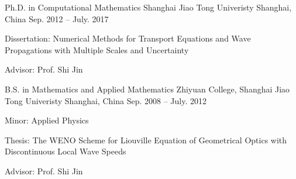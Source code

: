

\begin{cventries}

  \cventry
    {Ph.D. in Computational Mathematics} %
    {Shanghai Jiao Tong Univeristy} %
    {Shanghai, China} %
    {Sep. 2012 -- July. 2017} %
    {
      \begin{cvitems} %
        \item {Dissertation: Numerical Methods for Transport Equations
          and Wave Propagations with Multiple Scales and Uncertainty}
        \item {Advisor: Prof. Shi Jin}
      \end{cvitems}
    }

  \cventry
    {B.S. in Mathematics and Applied Mathematics} %
    {Zhiyuan College, Shanghai Jiao Tong Univeristy} %
    {Shanghai, China} %
    {Sep. 2008 -- July. 2012} %
    {
      \begin{cvitems} %
        \item {Minor: Applied Physics}
        \item {Thesis: The WENO Scheme for Liouville Equation of Geometrical
          Optics with Discontinuous Local Wave Speeds}
        \item {Advisor: Prof. Shi Jin}
      \end{cvitems}
    }

\end{cventries}
